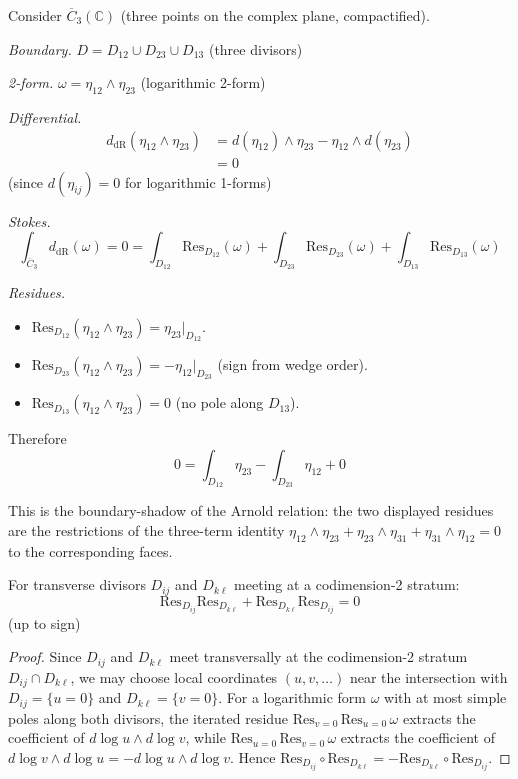 \begin{example}\label{ex:stokes-three-points}
Consider $\overline{C}_3(\mathbb{C})$ (three points on the complex plane, compactified).

\emph{Boundary.} $D = D_{12} \cup D_{23} \cup D_{13}$ (three divisors)

\emph{2-form.} $\omega = \eta_{12} \wedge \eta_{23}$ (logarithmic 2-form)

\emph{Differential.}
\begin{align*}
d_{\text{dR}}(\eta_{12} \wedge \eta_{23}) &= d(\eta_{12}) \wedge \eta_{23} - \eta_{12} \wedge d(\eta_{23}) \\
&= 0
\end{align*}
(since $d(\eta_{ij}) = 0$ for logarithmic 1-forms)

\emph{Stokes.}
\[\int_{\overline{C}_3} d_{\text{dR}}(\omega) = 0 = \int_{D_{12}} \text{Res}_{D_{12}}(\omega) + \int_{D_{23}} \text{Res}_{D_{23}}(\omega) + \int_{D_{13}} \text{Res}_{D_{13}}(\omega)\]

\emph{Residues.}
\begin{itemize}
\item $\text{Res}_{D_{12}}(\eta_{12} \wedge \eta_{23}) = \eta_{23}|_{D_{12}}$.
\item $\text{Res}_{D_{23}}(\eta_{12} \wedge \eta_{23}) = -\eta_{12}|_{D_{23}}$ (sign from wedge order).
\item $\text{Res}_{D_{13}}(\eta_{12} \wedge \eta_{23}) = 0$ (no pole along $D_{13}$).
\end{itemize}

Therefore
\[0 = \int_{D_{12}} \eta_{23} - \int_{D_{23}} \eta_{12} + 0\]

This is the boundary-shadow of the Arnold relation: the two displayed
residues are the restrictions of the three-term identity
$\eta_{12}\wedge\eta_{23}
+\eta_{23}\wedge\eta_{31}
+\eta_{31}\wedge\eta_{12}=0$ to the corresponding faces.
\end{example}

\begin{corollary}\label{cor:residues-anticommute}
For transverse divisors $D_{ij}$ and $D_{k\ell}$ meeting at a codimension-2 stratum:
\[\text{Res}_{D_{ij}} \text{Res}_{D_{k\ell}} + \text{Res}_{D_{k\ell}} \text{Res}_{D_{ij}} = 0\]
(up to sign)
\end{corollary}

\begin{proof}
Since $D_{ij}$ and $D_{k\ell}$ meet transversally at the codimension-2 stratum $D_{ij} \cap D_{k\ell}$, we may choose local coordinates $(u,v, \ldots)$ near the intersection with $D_{ij} = \{u = 0\}$ and $D_{k\ell} = \{v = 0\}$. For a logarithmic form $\omega$ with at most simple poles along both divisors, the iterated residue $\mathrm{Res}_{v=0}\,\mathrm{Res}_{u=0}\,\omega$ extracts the coefficient of $d\log u \wedge d\log v$, while $\mathrm{Res}_{u=0}\,\mathrm{Res}_{v=0}\,\omega$ extracts the coefficient of $d\log v \wedge d\log u = -d\log u \wedge d\log v$. Hence $\mathrm{Res}_{D_{ij}} \circ \mathrm{Res}_{D_{k\ell}} = -\mathrm{Res}_{D_{k\ell}} \circ \mathrm{Res}_{D_{ij}}$.
\end{proof}

